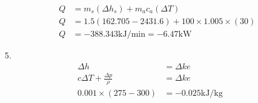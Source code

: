 \documentclass{article}
\begin{document}
\begin{itemize}
\begin{itemize}
\begin{align*}
            Q &= m_s(\Delta h_s)+ m_ac_a(\Delta T)\\
            Q &= 1.5(162.705-2431.6)+100\times1.005\times(30)\\
            Q &= -388.343\text{kJ/min} = -6.47 \text{kW}
        \end{align*}
    \end{itemize}
    \item [5.]
    \begin{align*}
        \Delta h &= \Delta ke\\
        c\Delta T+\frac{\Delta p}{\rho}&= \Delta ke\\
        0.001\times (275-300) &= -0.025 \text{kJ/kg}
    \end{align*}
\end{itemize}
\end{document}
